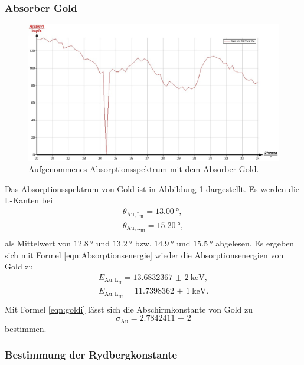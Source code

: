 \subsubsection{Absorber Gold}
\begin{figure}
	\includegraphics[width=1.0\textwidth]{nIKO_und_jULIAN_ÜLADS/gold.jpg}
	\caption{Aufgenommenes Absorptionsspektrum mit dem Absorber Gold.}
	\label{fig:gold_absorber}
\end{figure}
Das Absorptionsspektrum von Gold ist in Abbildung \ref{fig:gold_absorber} dargestellt.
Es werden die L-Kanten bei
\begin{gather*}
	\theta_{\mathrm{Au,L}_{\mathrm{II}}} = \SI{13,00}{\degree} \mathrm{,} \\
	\theta_{\mathrm{Au,L}_{\mathrm{III}}} = \SI{15,20}{\degree} \mathrm{,} \\
\end{gather*}
als Mittelwert von $\SI{12,8}{\degree}$ und $\SI{13,2}{\degree}$ bzw. $\SI{14,9}{\degree}$
und $\SI{15,5}{\degree}$ abgelesen.
Es ergeben sich mit Formel \eqref{eqn:Absorptionsenergie} wieder die Absorptionsenergien von
Gold zu
\begin{gather*}
	E_{\mathrm{Au,L}_{\mathrm{II}}} = \SI{13,6832367(2)}{\kilo\electronvolt} \mathrm{,} \\
	E_{\mathrm{Au,L}_{\mathrm{III}}} = \SI{11,7398362(1)}{\kilo\electronvolt} \mathrm{.} \\
\end{gather*}
Mit Formel \eqref{eqn:goldi} lässt sich die Abschirmkonstante von Gold zu 
\begin{equation*}
	\sigma_{\mathrm{Au}} = \num{2,7842411(2)}
\end{equation*}
bestimmen.

\subsubsection{Bestimmung der Rydbergkonstante}

